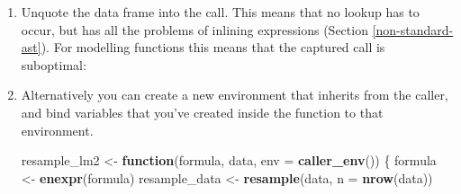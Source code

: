 \documentclass[]{book}
\newenvironment{Shaded}{\begin{snugshade}}{\end{snugshade}}
\newcommand{\CommentTok}[1]{\textcolor[rgb]{0.37,0.37,0.37}{\textit{#1}}}
\newcommand{\ControlFlowTok}[1]{\textcolor[rgb]{0.27,0.27,0.27}{\textbf{#1}}}
\newcommand{\DataTypeTok}[1]{\textcolor[rgb]{0.27,0.27,0.27}{#1}}
\newcommand{\KeywordTok}[1]{\textcolor[rgb]{0.27,0.27,0.27}{\textbf{#1}}}
\newcommand{\NormalTok}[1]{#1}
\newcommand{\OperatorTok}[1]{\textcolor[rgb]{0.43,0.43,0.43}{\textbf{#1}}}
\newcommand{\StringTok}[1]{\textcolor[rgb]{0.5,0.5,0.5}{#1}}
\begin{document}
\begin{enumerate}
\def\labelenumi{\arabic{enumi}.}
\item
  Unquote the data frame into the call. This means that no lookup has
  to occur, but has all the problems of inlining expressions (Section
  \ref{non-standard-ast}). For modelling functions this means that the
  captured call is suboptimal:

\begin{Shaded}
\end{Shaded}
\item
  Alternatively you can create a new environment that inherits from the
  caller, and bind variables that you've created inside the
  function to that environment.

\begin{Shaded}
\begin{Highlighting}[]
\NormalTok{resample_lm2 <-}\StringTok{ }\ControlFlowTok{function}\NormalTok{(formula, data, }\DataTypeTok{env =} \KeywordTok{caller_env}\NormalTok{()) \{}
\NormalTok{  formula <-}\StringTok{ }\KeywordTok{enexpr}\NormalTok{(formula)}
\NormalTok{  resample_data <-}\StringTok{ }\KeywordTok{resample}\NormalTok{(data, }\DataTypeTok{n =} \KeywordTok{nrow}\NormalTok{(data))}


\end{Highlighting}
\end{Shaded}
\end{enumerate}
\end{document}
